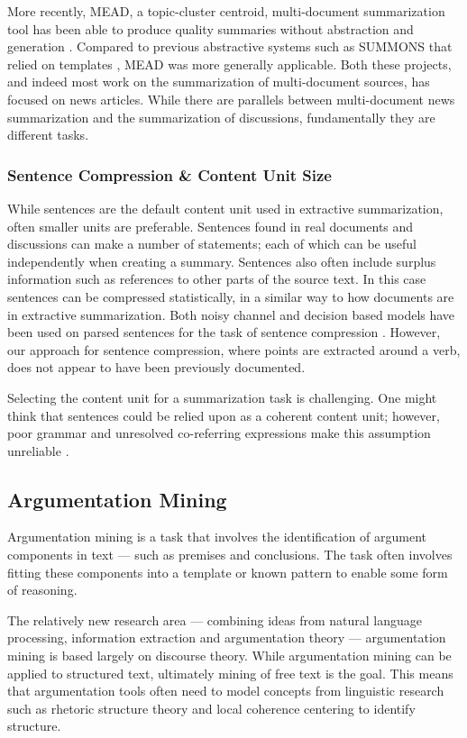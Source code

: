        More recently, MEAD, a topic-cluster centroid, multi-document summarization tool has been able to produce quality summaries without abstraction and generation \cite{radev2000centroid}. Compared to previous abstractive systems such as SUMMONS that relied on templates \cite{mckeown1995generating}, MEAD was more generally applicable. Both these projects, and indeed most work on the summarization of multi-document sources, has focused on news articles. While there are parallels between multi-document news summarization and the summarization of discussions, fundamentally they are different tasks.

      \tocless\subsubsection{Sentence Compression \& Content Unit Size}

        While sentences are the default content unit used in extractive summarization, often smaller units are preferable. Sentences found in real documents and discussions can make a number of statements; each of which can be useful independently when creating a summary. Sentences also often include surplus information such as references to other parts of the source text. In this case sentences can be compressed statistically, in a similar way to how documents are in extractive summarization. Both noisy channel and decision based models have been used on parsed sentences for the task of sentence compression \cite{knight2000statistics}. However, our approach for sentence compression, where points are extracted around a verb, does not appear to have been previously documented.

        Selecting the content unit for a summarization task is challenging. One might think that sentences could be relied upon as a coherent content unit; however, poor grammar and unresolved co-referring expressions make this assumption unreliable \cite{witbrock1999ultra}.

    \tocless\subsection{Argumentation Mining}
      Argumentation mining is a task that involves the identification of argument components in text --- such as premises and conclusions. The task often involves fitting these components into a template or known pattern to enable some form of reasoning. \cite{palau2009argumentation}

      The relatively new research area  --- combining ideas from natural language processing, information extraction and argumentation theory --- argumentation mining is based largely on discourse theory. While argumentation mining can be applied to structured text, ultimately mining of free text is the goal. This means that argumentation tools often need to model concepts from linguistic research such as rhetoric structure theory \cite{mann1988rhetorical} and local coherence centering \cite{weinstein21centering} to identify structure.


